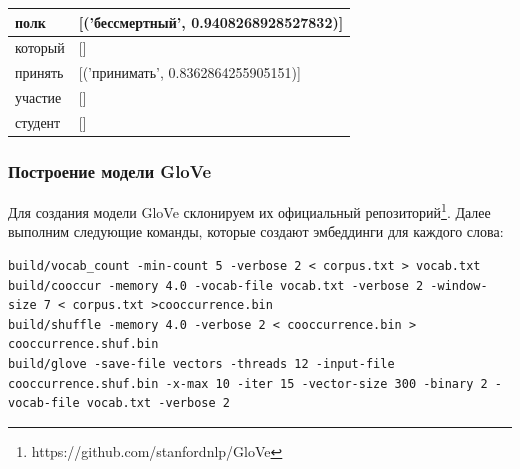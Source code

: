 \documentclass[coursework]{SCWorks}
\begin{document}
\begin{table}[!h]
\begin{tabular}{|l|l|}
        полк                                & {[}('бессмертный', 0.9408268928527832){]}                                                                                                                                                                                                                                                                                                                  \\ \hline
        который                             & {[}{]}                                                                                                                                                                                                                                                                                                                                                     \\ \hline
        принять                             & {[}('принимать', 0.8362864255905151){]}                                                                                                                                                                                                                                                                                                                    \\ \hline
        участие                             & {[}{]}                                                                                                                                                                                                                                                                                                                                                     \\ \hline
        студент                             & {[}{]}                                                                                                                                                                                                                                                                                                                                                     \\ \hline
    \end{tabular}
    \label{table:word2vec-example}
\end{table}
\subsubsection{Построение модели GloVe}
Для создания модели GloVe склонируем их официальный репозиторий\footnote{https://github.com/stanfordnlp/GloVe}. Далее выполним следующие команды, которые создают эмбеддинги для каждого слова:
\begin{verbatim}
build/vocab_count -min-count 5 -verbose 2 < corpus.txt > vocab.txt
build/cooccur -memory 4.0 -vocab-file vocab.txt -verbose 2 -window-size 7 < corpus.txt >cooccurrence.bin
build/shuffle -memory 4.0 -verbose 2 < cooccurrence.bin > cooccurrence.shuf.bin
build/glove -save-file vectors -threads 12 -input-file cooccurrence.shuf.bin -x-max 10 -iter 15 -vector-size 300 -binary 2 -vocab-file vocab.txt -verbose 2
\end{verbatim}
\end{document}
